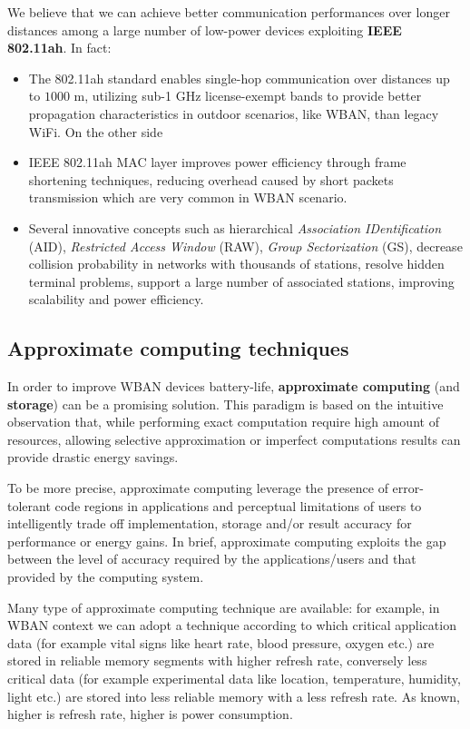 \documentclass[sigchi]{acmart}
\begin{document}
We believe that we can achieve better communication performances over longer distances among a large number of low-power devices exploiting \textbf{IEEE 802.11ah}. In fact:

\begin{itemize}
\item The 802.11ah standard enables single-hop communication over distances up to $1000$ m, utilizing sub-1 GHz license-exempt bands to provide better propagation characteristics in outdoor scenarios, like WBAN, than legacy WiFi. On the other side

\item IEEE 802.11ah MAC layer improves power efficiency through frame shortening techniques, reducing overhead caused by short packets transmission which are very common in WBAN scenario.

\item Several innovative concepts such as hierarchical \textit{Association IDentification} (AID), \textit{Restricted Access Window} (RAW), \textit{Group Sectorization} (GS), decrease collision probability in networks with thousands of stations, resolve hidden terminal problems, support a large number of associated stations, improving scalability and power efficiency.

\end{itemize}

\subsection{Approximate computing techniques}

In order to improve WBAN devices battery-life, \textbf{approximate computing} (and \textbf{storage}) can be a promising solution. This paradigm is based on the intuitive observation that, while performing exact computation require high amount of resources, allowing selective approximation or imperfect computations results can provide drastic energy savings.

To be more precise, approximate computing leverage the presence of error-tolerant code regions in applications and perceptual limitations of users to intelligently trade off implementation, storage and/or result accuracy for performance or energy gains. In brief, approximate computing exploits the gap between the level of accuracy required by the applications/users and that provided by the computing system.

Many type of approximate computing technique are available: for example, in WBAN context we can adopt a technique according to which critical application data (for example vital signs like heart rate, blood pressure, oxygen etc.) are stored in reliable memory segments with higher refresh rate, conversely less critical data (for example experimental data like location, temperature, humidity, light etc.) are stored into less reliable memory with a less refresh rate. As known, higher is refresh rate, higher is power consumption.\cite{Towards}
\end{document}
